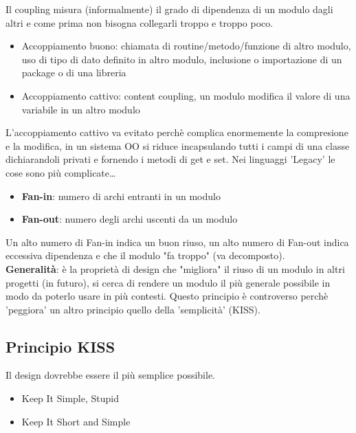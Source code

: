 \documentclass[12pt, a4paper]{report}
\begin{document}
Il coupling misura (informalmente) il grado di dipendenza di un modulo dagli altri e come prima non bisogna collegarli troppo e troppo poco.
\begin{itemize}
    \item Accoppiamento buono: chiamata di routine/metodo/funzione di altro modulo, uso di tipo di dato definito in altro modulo, inclusione o importazione di un package o di una libreria
    \item Accoppiamento cattivo: content coupling, un modulo modifica il valore di una variabile in un altro modulo
\end{itemize}
L'accoppiamento cattivo va evitato perchè complica enormemente la compresione e la modifica, in un sistema OO si riduce incapsulando tutti i campi di una classe dichiarandoli privati e fornendo i metodi di get e set. Nei linguaggi 'Legacy' le cose sono più complicate\ldots
\begin{itemize}
    \item \textbf{Fan-in}: numero di archi entranti in un modulo
    \item \textbf{Fan-out}: numero degli archi uscenti da un modulo
\end{itemize}
Un alto numero di Fan-in indica un buon riuso, un alto numero di Fan-out indica eccessiva dipendenza e che il modulo "fa troppo" (va decomposto).\\
\textbf{Generalità}: è la proprietà di design che "migliora" il riuso di un modulo in altri progetti (in futuro), si cerca di rendere un modulo il più generale possibile in modo da poterlo usare in più contesti. Questo principio è controverso perchè 'peggiora' un altro principio quello della 'semplicità' (KISS).
\subsection{Principio KISS}
Il design dovrebbe essere il più semplice possibile.
\begin{itemize}
    \item Keep It Simple, Stupid
    \item Keep It Short and Simple
\end{itemize}
\end{document}
